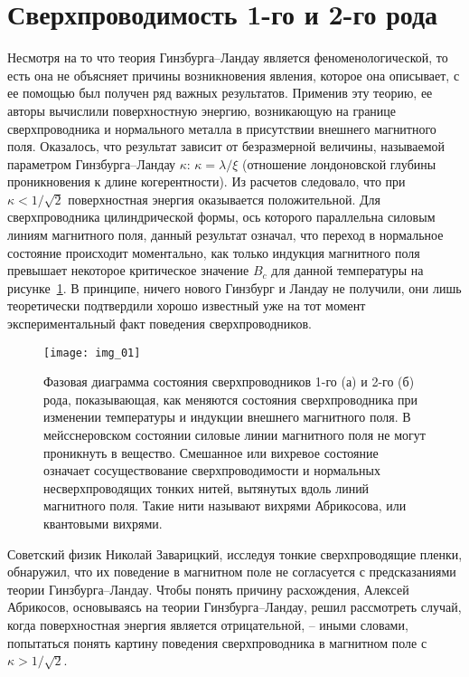 \section{Сверхпроводимость 1-го и 2-го рода}

Несмотря на то что теория Гинзбурга–Ландау является феноменологической, то 
есть она не объясняет причины возникновения явления, которое она описывает, с 
ее помощью был получен ряд важных результатов. Применив эту теорию, ее авторы 
вычислили поверхностную энергию, возникающую на границе сверхпроводника и 
нормального металла в присутствии внешнего магнитного поля. Оказалось, что 
результат зависит от безразмерной величины, называемой параметром 
Гинзбурга–Ландау \( \kappa \): \( \kappa = \lambda/\xi \) (отношение 
лондоновской глубины проникновения к длине когерентности). Из расчетов 
следовало, что при \( \kappa < 1/\sqrt{2} \) поверхностная энергия оказывается 
положительной. Для сверхпроводника цилиндрической формы, ось которого 
параллельна силовым линиям магнитного поля, данный результат означал, что 
переход в нормальное состояние происходит моментально, как только индукция 
магнитного поля превышает некоторое критическое значение \( B_c \) для данной 
температуры на рисунке~\ref{img:01}. В принципе, ничего нового Гинзбург и 
Ландау не получили, они лишь теоретически подтвердили хорошо известный уже на 
тот момент экспериментальный факт поведения сверхпроводников.

\begin{figure}[h!]
    \center
    \texttt{[image: img\_01]}
    \caption{Фазовая диаграмма состояния сверхпроводников 1-го (а) и 
        2-го (б) рода, показывающая, как меняются состояния сверхпроводника 
        при изменении температуры и индукции внешнего магнитного поля. В 
        мейсснеровском состоянии силовые линии магнитного поля не могут 
        проникнуть в вещество. Смешанное или вихревое состояние означает 
        сосуществование сверхпроводимости и нормальных несверхпроводящих 
        тонких нитей, вытянутых вдоль линий магнитного поля. Такие нити 
        называют вихрями Абрикосова, или квантовыми вихрями.}
    \label{img:01}
\end{figure}

Советский физик Николай Заварицкий, исследуя тонкие сверхпроводящие пленки, 
обнаружил, что их поведение в магнитном поле не согласуется с предсказаниями 
теории Гинзбурга–Ландау. Чтобы понять причину расхождения, Алексей Абрикосов, 
основываясь на теории Гинзбурга–Ландау, решил рассмотреть случай, когда 
поверхностная энергия является отрицательной, -- иными словами, попытаться 
понять картину поведения сверхпроводника в магнитном поле с 
\( \kappa > 1/\sqrt{2} \).

